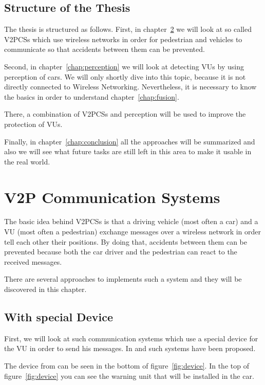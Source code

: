 \documentclass[]{ccs-thesis}
\begin{document}
\section{Structure of the Thesis}
\label{sec:structure}

The thesis is structured as follows. First, in chapter~\ref{chap:v2p} we will look at so called \acp{V2PCS} which use wireless networks in order for pedestrian and vehicles to communicate so that accidents between them can be prevented.

Second, in chapter~\ref{chap:perception} we will look at detecting \acp{VU} by using perception of cars. We will only shortly dive into this topic, because it is not directly connected to Wireless Networking. Nevertheless, it is necessary to know the basics in order to understand chapter~\ref{chap:fusion}.

There, a combination of \acp{V2PCS} and perception will be used to improve the protection of \acp{VU}.

Finally, in chapter~\ref{chap:conclusion} all the approaches will be summarized and also we will see what future tasks are still left in this area to make it usable in the real world.


\chapter{V2P Communication Systems}
\label{chap:v2p}

The basic idea behind \acp{V2PCS} is that a driving vehicle (most often a car) and a \ac{VU} (most often a pedestrian) exchange messages over a wireless network in order tell each other their positions. By doing that, accidents between them can be prevented because both the car driver and the pedestrian can react to the received messages.

There are several approaches to implements such a system and they will be discovered in this chapter.

\section{With special Device}\label{sec:special device}

First, we will look at such communication systems which use a special device for the \ac{VU} in order to send his messages. In \cite{v2pprotection} and \cite{watchover} such systems have been proposed. 

The device from \cite{v2pprotection} can be seen in the bottom of figure~\ref{fig:device}. In the top of figure~\ref{fig:device} you can see the warning unit that will be installed in the car.
\end{document}
